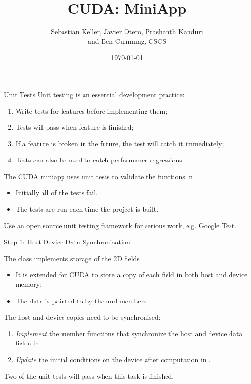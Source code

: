 \documentclass[aspectratio=43]{beamer}
\author{Sebastian Keller, Javier Otero, Prashanth Kanduri\\ and Ben Cumming, CSCS}
\title{CUDA: MiniApp}
\subtitle{}
\date{\today}
\begin{document}
\cscstitle

\begin{frame}[fragile]{Unit Tests}
    Unit testing is an essential development practice:
    \begin{enumerate}
        \item Write tests for features before implementing them;
        \item Tests will pass when feature is finished;
        \item If a feature is broken in the future, the test will catch it immediately;
        \item Tests can also be used to catch performance regressions.
    \end{enumerate}
    The CUDA miniapp uses unit tests to validate the functions in 
    \begin{itemize}
        \item Initially all of the tests fail.
        \item The tests are run each time the project is built.
    \end{itemize}
    Use an open source unit testing framework for serious work, e.g. Google Test.
\end{frame}

\begin{frame}[fragile]{Step 1: Host-Device Data Synchronization}
    \begin{info}{The  class implements storage of the 2D fields}
        \begin{itemize}
            \item It is extended for CUDA to store a copy of each field in both host and device memory;
            \item The data is pointed to by the  and  members.
        \end{itemize}
    \end{info}
    The host and device copies need to be synchronised:
    \begin{enumerate}
        \item \emph{Implement} the member functions that synchronize the host and device data fields in .
        \item \emph{Update} the initial conditions on the device after computation in .
    \end{enumerate}
    \begin{info}{}
        Two of the unit tests will pass when this task is finished.
    \end{info}
\end{frame}
\end{document}
